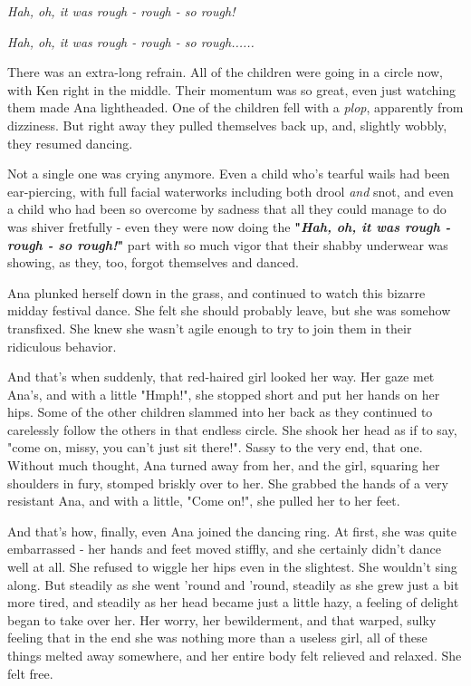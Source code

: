 \documentclass[
]{article}
\begin{document}
\emph{Hah, oh, it was rough - rough - so rough!}

\emph{Hah, oh, it was rough - rough - so rough......}

There was an extra-long refrain. All of the children were going in a
circle now, with Ken right in the middle. Their momentum was so great,
even just watching them made Ana lightheaded. One of the children fell
with a \emph{plop}, apparently from dizziness. But right away they
pulled themselves back up, and, slightly wobbly, they resumed dancing.

Not a single one was crying anymore. Even a child who's tearful wails
had been ear-piercing, with full facial waterworks including both drool
\emph{and} snot, and even a child who had been so overcome by sadness
that all they could manage to do was shiver fretfully - even they were
now doing the \textbf{"}\emph{\textbf{Hah, oh, it was rough - rough - so
rough!}}\textbf{"} part with so much vigor that their shabby underwear
was showing, as they, too, forgot themselves and danced.

Ana plunked herself down in the grass, and continued to watch this
bizarre midday festival dance. She felt she should probably leave, but
she was somehow transfixed. She knew she wasn't agile enough to try to
join them in their ridiculous behavior.

And that's when suddenly, that red-haired girl looked her way. Her gaze
met Ana's, and with a little "Hmph!", she stopped short and put her
hands on her hips. Some of the other children slammed into her back as
they continued to carelessly follow the others in that endless circle.
She shook her head as if to say, "come on, missy, you can't just sit
there!". Sassy to the very end, that one. Without much thought, Ana
turned away from her, and the girl, squaring her shoulders in fury,
stomped briskly over to her. She grabbed the hands of a very resistant
Ana, and with a little, "Come on!", she pulled her to her feet.

And that's how, finally, even Ana joined the dancing ring. At first, she
was quite embarrassed - her hands and feet moved stiffly, and she
certainly didn't dance well at all. She refused to wiggle her hips even
in the slightest. She wouldn't sing along. But steadily as she went
'round and 'round, steadily as she grew just a bit more tired, and
steadily as her head became just a little hazy, a feeling of delight
began to take over her. Her worry, her bewilderment, and that warped,
sulky feeling that in the end she was nothing more than a useless girl,
all of these things melted away somewhere, and her entire body felt
relieved and relaxed. She felt free.
\end{document}
